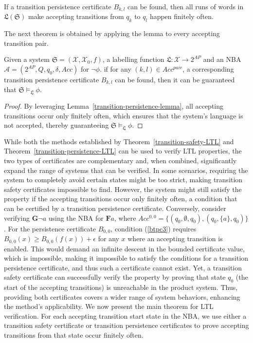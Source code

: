 \begin{lemma}
  \label{transition-persistence-lemma}
  If a transition persistence certificate $B_{k,l}$ can be found, then all runs of words in $\mathfrak{L}(\mathfrak{S})$ make accepting transitions from $q_k$ to $q_l$ happen finitely often.
\end{lemma}

The next theorem is obtained by applying the lemma to every accepting transition pair.

\begin{theorem}
  \label{transition-persistence-LTL}
  Given a system $\mathfrak{S} = (\mathcal{X}, \mathcal{X}_0, f)$, a labelling function $\mathfrak{L}:\mathcal{X} \rightarrow 2^{AP}$ and an NBA $\mathcal{A} = (2^{AP}, Q, q_0, \delta, Acc)$ for $\neg\phi$. if for any $(k, l) \in Acc^{pair}$, a corresponding transition persistence certificate $B_{k,l}$ can be found, then it can be guaranteed that $\mathfrak{S} \models_{\mathfrak{L}} \phi$.
\end{theorem}

\begin{proof}
By leveraging Lemma~\ref{transition-persistence-lemma}, all accepting transitions occur only finitely often, which ensures that the system's language is not accepted, thereby guaranteeing $\mathfrak{S} \models_{\mathfrak{L}} \phi$.
\end{proof}

While both the methods established by​ Theorem~\ref{transition-safety-LTL} and Theorem~\ref{transition-persistence-LTL} can be used to verify LTL properties, the two types of certificates are complementary and, when combined, significantly expand the range of systems that can be verified. In some scenarios, requiring the system to completely avoid certain states might be too strict, making transition safety certificates impossible to find. However, the system might still satisfy the property if the accepting transitions occur only finitely often, a condition that can be certified by a transition persistence certificate. Conversely, consider verifying $\mathbf{G} \neg a$ using the NBA for $\mathbf{F} a$, where $Acc^{0,0} = \{(q_0, \emptyset, q_0), (q_0, \{a\}, q_0)\}$. For the persistence certificate $B_{0,0}$, condition (\ref{btpc3}) requires $B_{0,0}(x) \geq B_{0,0}(f(x)) + \epsilon$ for any $x$ where an accepting transition is enabled. This would demand an infinite descent in the bounded certificate value, which is impossible, making it impossible to satisfy the conditions for a transition persistence certificate, and thus such a certificate cannot exist. Yet, a transition safety certificate can successfully verify the property by proving that state $q_0$ (the start of the accepting transitions) is unreachable in the product system. Thus, providing both certificates covers a wider range of system behaviors, enhancing the method's applicability. We now present the main theorem for LTL verification. For each accepting transition start state in the NBA, we use either a transition safety certificate or transition persistence certificates to prove accepting transitions from that state occur finitely often.


